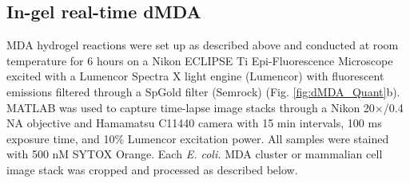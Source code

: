 \subsection{In-gel real-time dMDA}
MDA hydrogel reactions were set up as described above and conducted at room temperature for 6 hours on a Nikon ECLIPSE Ti Epi-Fluorescence Microscope excited with a Lumencor Spectra X light engine (Lumencor) with fluorescent emissions filtered through a SpGold filter (Semrock) (Fig. \ref{fig:dMDA_Quant}b). MATLAB was used to capture time-lapse image stacks through a Nikon 20$\times$\slash 0.4 NA objective and Hamamatsu C11440 camera with 15 min intervals, 100 ms exposure time, and 10\% Lumencor excitation power. All samples were stained with 500 nM SYTOX Orange. Each \textit{E. coli.} MDA cluster or mammalian cell image stack was cropped and processed as described below.





